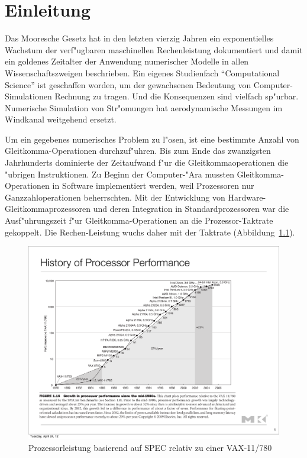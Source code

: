 \chapter{Einleitung}
\rhead{}
Das Mooresche Gesetz hat in den letzten vierzig Jahren ein
exponentielles Wachstum der verf"ugbaren maschinellen Rechenleistung
dokumentiert und damit ein goldenes Zeitalter der Anwendung numerischer
Modelle in allen Wissenschaftszweigen beschrieben.
Ein eigenes Studienfach ``Computational Science'' ist geschaffen worden,
um der gewachsenen Bedeutung von Computer-Simulationen Rechnung zu
tragen. Und die Konsequenzen sind vielfach sp"urbar.
Numerische Simulation von Str"omungen hat aerodynamische Messungen
im Windkanal weitgehend ersetzt.

Um ein gegebenes numerisches Problem zu l"osen, ist eine bestimmte
Anzahl von Gleit\-komma-Operationen durchzuf"uhren.
Bis zum Ende das zwanzigsten Jahrhunderts dominierte der Zeitaufwand f"ur
die Gleitkommaoperationen die "ubrigen Instruktionen.
Zu Beginn der Computer-"Ara mussten Gleitkomma-Operationen in Software
implementiert werden, weil Prozessoren nur Ganzzahloperationen 
beherrschten. Mit der Entwicklung von Hardware-Gleitkommaprozessoren
und deren Integration in Standardprozessoren war die Ausf"uhrungszeit
f"ur Gleitkomma-Operationen an die Prozessor-Taktrate gekoppelt.
Die Rechen-Leistung wuchs daher mit der Taktrate
(Abbildung~\ref{processorperformance}).
\begin{figure}
\begin{center}
\includegraphics[width=\hsize]{images/processorperformance.pdf}
\end{center}
\caption{Prozessorleistung basierend auf SPEC relativ zu einer VAX-11/780}
\label{processorperformance}
\end{figure}

